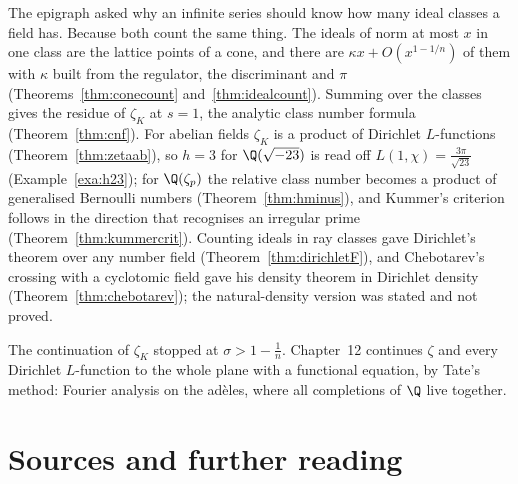 The epigraph asked why an infinite series should know how many ideal classes a field has. Because both count the same
thing. The ideals of norm at most $x$ in one class are the lattice points of a cone, and there are $\kappa x+O(x^{1-1/n})$ of them
with $\kappa$ built from the regulator, the discriminant and $\pi$ (Theorems~\ref{thm:conecount} and~\ref{thm:idealcount}). Summing
over the classes gives the residue of $\zeta_K$ at $s=1$, the analytic class number formula (Theorem~\ref{thm:cnf}). For abelian
fields $\zeta_K$ is a product of Dirichlet $L$-functions (Theorem~\ref{thm:zetaab}), so $h=3$ for $\Q(\sqrt{-23})$ is read off
$L(1,\chi)=\frac{3\pi}{\sqrt{23}}$ (Example~\ref{exa:h23}); for $\Q(\zeta_p)$ the relative class number becomes a product of
generalised Bernoulli numbers (Theorem~\ref{thm:hminus}), and Kummer's criterion follows in the direction that recognises an
irregular prime (Theorem~\ref{thm:kummercrit}). Counting ideals in ray classes gave Dirichlet's theorem over any number field
(Theorem~\ref{thm:dirichletF}), and Chebotarev's crossing with a cyclotomic field gave his density theorem in Dirichlet density
(Theorem~\ref{thm:chebotarev}); the natural-density version was stated and not proved.

The continuation of $\zeta_K$ stopped at $\sigma>1-\frac1n$. Chapter~12 continues $\zeta$ and every Dirichlet $L$-function to the
whole plane with a functional equation, by Tate's method: Fourier analysis on the ad\`eles, where all completions of $\Q$ live
together.

\section*{Sources and further reading}

